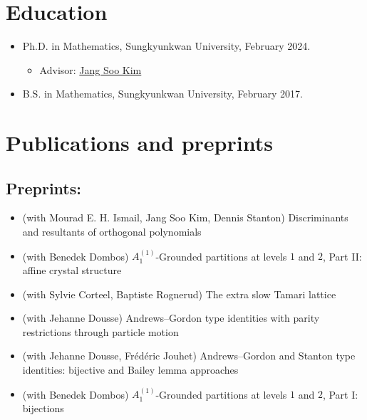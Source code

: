 \documentclass[letterpaper]{article}
\begin{document}
\section*{Education}

\begin{itemize}
  \item Ph.D. in Mathematics, Sungkyunkwan University, February 2024.
    \begin{itemize}
    \item Advisor: \href{https://jangsookim.github.io/}{Jang Soo Kim}
    \end{itemize}

  \item B.S. in Mathematics, Sungkyunkwan University, February 2017.
\end{itemize}









\section*{Publications and preprints}

\subsection*{Preprints:}
\begin{itemize}
\item (with Mourad E. H. Ismail, Jang Soo Kim, Dennis Stanton) Discriminants and resultants of orthogonal polynomials
\item (with Benedek Dombos) $A_1^{(1)}$-Grounded partitions at levels $1$ and $2$, Part II: affine crystal structure
\item (with Sylvie Corteel, Baptiste Rognerud) The extra slow Tamari lattice
\item (with Jehanne Dousse) Andrews--Gordon type identities with parity restrictions through particle motion 
\item (with Jehanne Dousse, Fr\'ed\'eric Jouhet) Andrews--Gordon and Stanton type identities: bijective and Bailey lemma approaches 
\item (with Benedek Dombos) $A_1^{(1)}$-Grounded partitions at levels $1$ and $2$, Part I: bijections
\end{itemize}
\end{document}
